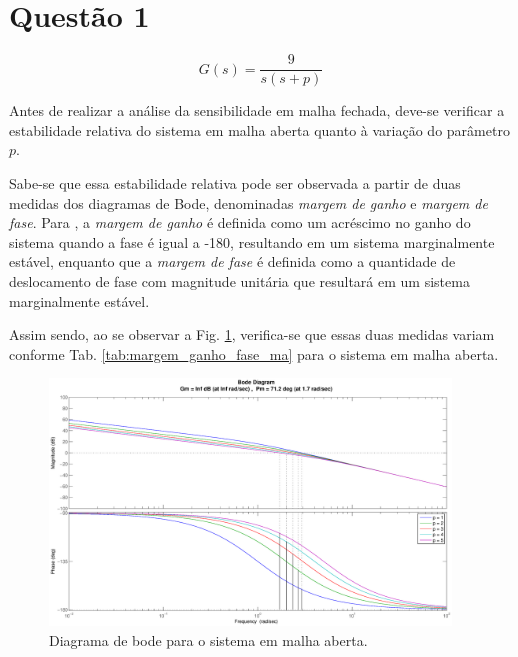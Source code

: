 \section*{Questão 1}

\begin{equation}\nonumber
G(s) = \frac{9}{s(s+p)}
\end{equation}


\vspace{0.5cm}


\vspace{0.25cm}

\noindent Antes de realizar a análise da sensibilidade em malha fechada, deve-se
verificar a estabilidade relativa do sistema em malha aberta quanto à variação
do parâmetro $p$. 

Sabe-se que essa estabilidade relativa pode ser observada a partir de duas
medidas dos diagramas de Bode, denominadas {\it margem de ganho} e {\it margem
de fase}. Para , a {\it margem de ganho} é definida como
um acréscimo no ganho do sistema quando a fase é igual a -180\textdegree,
resultando em um sistema marginalmente estável, enquanto que a {\it margem de
fase} é definida como a quantidade de deslocamento de fase com magnitude
unitária que resultará em um sistema marginalmente estável.

Assim sendo, ao se observar a Fig. \ref{fig:bode_ma}, verifica-se que essas duas
medidas variam conforme Tab. \ref{tab:margem_ganho_fase_ma} para o sistema em
malha aberta.

\begin{figure}[htb]
\centering
    \includegraphics[width=0.95\textwidth]{imgs/questao1/bode_ma}
    \caption{Diagrama de bode para o sistema em malha aberta.}
    \label{fig:bode_ma}
\end{figure}

